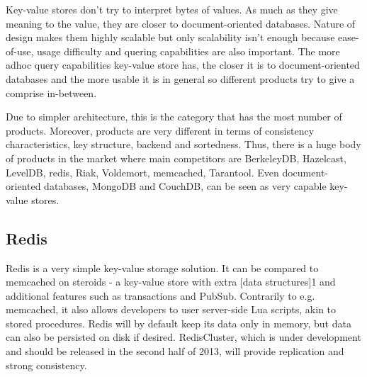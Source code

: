 Key-value stores don't try to interpret bytes of values. As much as they give meaning to the value, they are closer to document-oriented databases. Nature of design makes them highly scalable but only scalability isn't enough because ease-of-use, usage difficulty and quering capabilities are also important. The more adhoc query capabilities key-value store has, the closer it is to document-oriented databases and the more usable it is in general so different products try to give a comprise in-between.

Due to simpler architecture, this is the category that has the most number of products. Moreover, products are very different in terms of consistency characteristics, key structure, backend and sortedness. Thus, there is a huge body of products in the market where main competitors are BerkeleyDB, Hazelcast, LevelDB, redis, Riak, Voldemort, memcached, Tarantool. Even document-oriented databases, MongoDB and CouchDB, can be seen as very capable key-value stores.

\subsection{Redis}

Redis is a very simple key-value storage solution. It can be compared to memcached on steroids - a key-value store with extra [data structures]1 and additional features such as transactions and PubSub. Contrarily to e.g. memcached, it also allows developers to user server-side Lua scripts, akin to stored procedures. Redis will by default keep its data only in memory, but data can also be persisted on disk if desired. RedisCluster, which is under development and should be released in the second half of 2013, will provide replication and strong consistency.

